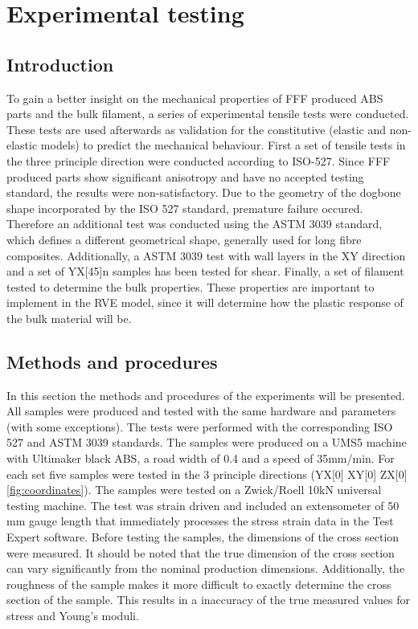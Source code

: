 \chapter{Experimental testing}
\label{chp:5}

\graphicspath{{chapter_5_Experimentaltesting/figures}}

\section{Introduction}
To gain a better insight on the mechanical properties of FFF produced ABS parts and the bulk filament, a series of experimental tensile tests were conducted. These tests are used afterwards as validation for the constitutive (elastic and non-elastic models) to predict the mechanical behaviour. First a set of tensile tests in the three principle direction were conducted according to ISO-527\cite{Afd2016NEN-EN-ISO527-1}\cite{Afd2016NEN-EN-ISO527-2}. Since FFF produced parts show significant anisotropy and have no accepted testing standard, the results were non-satisfactory. Due to the geometry of the dogbone shape incorporated by the ISO 527 standard, premature failure occured. Therefore an additional test was conducted using the ASTM 3039 \cite{ASTM2008ASTM3039} standard, which defines a different geometrical shape, generally used for long fibre composites. Additionally, a ASTM 3039 test with wall layers in the XY direction and a set of YX[45]n samples has been tested for shear. Finally, a set of filament tested to determine the bulk properties. These properties are important to implement in the RVE model, since it will determine how the plastic response of the bulk material will be. 

\section{Methods and procedures}
In this section the methods and procedures of the experiments will be presented. All samples were produced and tested with the same hardware and parameters (with some exceptions). The tests were performed with the corresponding ISO 527 and ASTM 3039 standards.
The samples were produced on a UMS5 machine with Ultimaker black ABS\cite{TechnicalUM}, a road width of 0.4 and a speed of 35mm/min. For each set five samples were tested in the 3 principle directions (YX[0] XY[0] ZX[0] \ref{fig:coordinates}). The samples were tested on a Zwick/Roell 10kN universal testing machine. The test was strain driven and included an extensometer of 50 mm gauge length that immediately processes the stress strain data in the Test Expert software. Before testing the samples, the dimensions of the cross section were measured. It should be noted that the true dimension of the cross section can vary significantly from the nominal production dimensions. Additionally, the roughness of the sample makes it more difficult to exactly determine the cross section of the sample. This results in a inaccuracy of the true measured values for stress and Young's moduli. 

